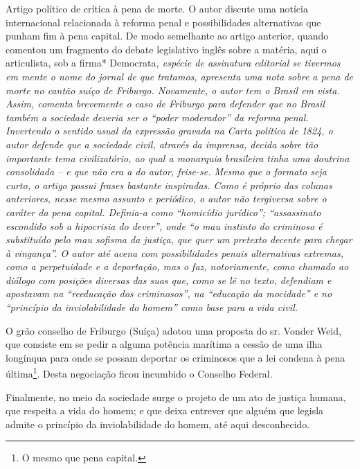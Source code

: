 \begin{didascalia}
Artigo político de crítica à pena de morte. O autor discute uma notícia
internacional relacionada à reforma penal e possibilidades alternativas
que punham fim à pena capital. De modo semelhante ao artigo anterior,
quando comentou um fragmento do debate legislativo inglês sobre a
matéria, aqui o articulista, sob a firma* Democrata\emph{, espécie de
assinatura editorial se tivermos em mente o nome do jornal de que
tratamos, apresenta uma nota sobre a pena de morte no cantão suíço de
Friburgo. Novamente, o autor tem o Brasil em vista. Assim, comenta
brevemente o caso de Friburgo para defender que no Brasil também a
sociedade deveria ser o ``poder moderador'' da reforma penal. Invertendo o
sentido usual da expressão gravada na Carta política de 1824, o autor
defende que a sociedade civil, através da imprensa, decida sobre tão
importante tema civilizatório, ao qual a monarquia brasileira tinha uma
doutrina consolidada -- e que não era a do autor, frise-se. Mesmo que o
formato seja curto, o artigo possui frases bastante inspiradas. Como é
próprio das colunas anteriores, nesse mesmo assunto e periódico, o autor
não tergiversa sobre o caráter da pena capital. Definia-a como
``homicídio jurídico''; ``assassinato escondido sob a hipocrisia do dever'',
onde ``o mau instinto do criminoso é substituído pelo mau sofisma da
justiça, que quer um pretexto decente para chegar à vingança''. O autor
até acena com possibilidades penais alternativas extremas, como a
perpetuidade e a deportação, mas o faz, notoriamente, como chamado ao
diálogo com posições diversas das suas que, como se lê no texto,
defendiam e apostavam na ``reeducação dos criminosos'', na ``educação da
mocidade'' e no ``princípio da inviolabilidade do homem'' como base para a
vida civil.}
\end{didascalia}

\asterisc{}

O grão conselho de Friburgo (Suíça) adotou uma proposta do sr. Vonder
Weid, que consiste em se pedir a alguma potência marítima a cessão de
uma ilha longínqua para onde se possam deportar os criminosos que a lei
condena à pena última\footnote{O mesmo que pena capital.}. Desta
negociação ficou incumbido o Conselho Federal.

Finalmente, no meio da sociedade surge o projeto de um ato de justiça
humana, que respeita a vida do homem; e que deixa entrever que alguém
que legisla admite o princípio da inviolabilidade do homem, até aqui
desconhecido.

